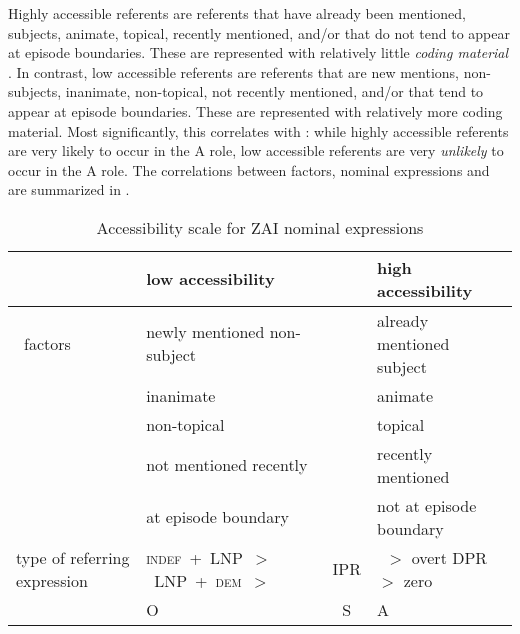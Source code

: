 Highly accessible referents are referents that have already been mentioned, subjects, animate, topical, recently mentioned, and/or that do not tend to appear at episode boundaries. These are represented with relatively little \textit{coding material} \citep{givon1983}. In contrast, low accessible referents are referents that are new mentions, non-subjects, inanimate, non-topical, not recently mentioned, and/or that tend to appear at episode boundaries. These are represented with relatively more coding material. Most significantly, this correlates with : while highly accessible referents are very likely to occur in the A role, low accessible referents are very \textit{unlikely} to occur in the A role. The correlations between  factors, nominal expressions and  are summarized in .


\begin{table}
\small
\begin{tabularx}{\textwidth}{Ql@{}c@{}l}
\lsptoprule
   
&    {low accessibility}  &  &  {high accessibility}  \\
  
 
\midrule 

\mbox{ factors} &  newly mentioned non-subject  &   & already mentioned  subject  \\
 
		      &    inanimate  &  & animate  \\
		      &     non-topical  &   & topical  \\
		      &      not mentioned recently  &  & recently mentioned   \\
		      &      at episode boundary  &   & not at episode boundary \\
       
  
\midrule
 
type of referring expression & \mbox{\textsc{indef}  + LNP $>$ LNP + \textsc{dem}  $>$} &    IPR   &~$>$  overt DPR $>$ zero \\
 

 
\midrule 
   & \hfill O \hfill &  S &\hfill A \hfill\\ 
\midrule

\end{tabularx}
\caption{{Accessibility scale for ZAI nominal expressions}}
\label{accessibilityscale}

\end{table}
 
